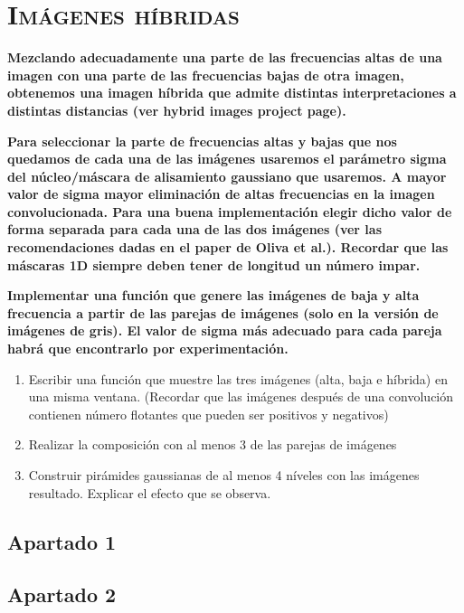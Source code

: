 \documentclass[11pt,a4paper]{article}
\begin{document}
\newpage

\section{\textsc{Imágenes híbridas}}

\noindent \textbf{Mezclando adecuadamente una parte de las frecuencias altas de una imagen con una parte de
las frecuencias bajas de otra imagen, obtenemos una imagen híbrida que admite distintas interpretaciones a distintas
distancias (ver hybrid images project page).}

\noindent \textbf{Para seleccionar la parte de frecuencias altas y bajas que nos quedamos
de cada una de las imágenes usaremos el parámetro sigma del núcleo/máscara de alisamiento gaussiano que usaremos.
A mayor valor de sigma mayor eliminación de altas frecuencias en la imagen convolucionada. Para una buena
implementación elegir dicho valor de forma separada para cada una de las dos imágenes (ver las recomendaciones
dadas en el paper de Oliva et al.). Recordar que las máscaras 1D siempre deben tener de longitud un número impar.}

\noindent \textbf{Implementar una función que genere las imágenes de baja y alta frecuencia a partir de las
parejas de imágenes (solo en la versión de imágenes de gris). El valor de sigma más adecuado para cada pareja
habrá que encontrarlo por experimentación.}

\begin{enumerate}
	\item Escribir una función que muestre las tres imágenes (alta, baja e híbrida) en una misma ventana.
	(Recordar que las imágenes después de una convolución contienen número flotantes que pueden ser positivos y negativos)
	\item Realizar la composición con al menos 3 de las parejas de imágenes
	\item Construir pirámides gaussianas de al menos 4 níveles con las imágenes resultado. Explicar el efecto que se observa.
\end{enumerate}

\subsection{Apartado 1}

\subsection{Apartado 2}
\end{document}
